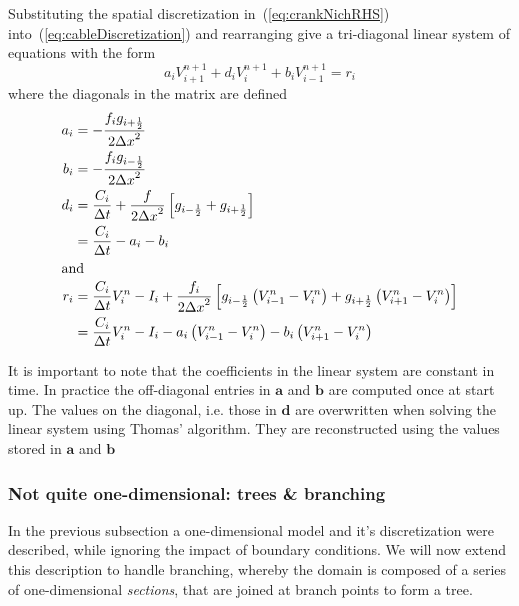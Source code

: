 \documentclass[11pt,a4paper]{article}
\newcommand{\eq}[1]{(\ref{#1})}
\newcommand{\dx}{{\Delta x}}
\newcommand{\dt}{{\Delta t}}
\newcommand{\at}[1]{{#1}_{i}}
\newcommand{\atplus}[1]{{#1}_{i+1}}
\newcommand{\atminus}[1]{{#1}_{i-1}}
\newcommand{\atplushalf}[1]{{#1}_{i+\frac{1}{2}}}
\newcommand{\atminushalf}[1]{{#1}_{i-\frac{1}{2}}}
\newcommand{\vv}[1]{\mathbf{#1}}
\begin{document}
Substituting the spatial discretization in~\eq{eq:crankNichRHS} into~\eq{eq:cableDiscretization} and rearranging give a tri-diagonal linear system of equations with the form
\begin{equation}
    \at{a} \atplus{V}^{n+1} + \at{d} \at{V}^{n+1} + \at{b} \atminus{V}^{n+1} = \at{r}
\end{equation}
where the diagonals in the matrix are defined
\begin{align}
    \at{a}  &=  -\frac{\at{f}\atplushalf{g}}{2\dx^2} \\
    \at{b}  &=  -\frac{\at{f}\atminushalf{g}}{2\dx^2} \\
    \at{d}  &=  \frac{\at{C}}{\dt} + \frac{f}{2\dx^2}\left[\atminushalf{g}+\atplushalf{g}\right] \nonumber\\
            &=  \frac{\at{C}}{\dt} - \at{a} - \at{b} \\
\intertext{and}
    \at{r}  &=  \frac{\at{C}}{\dt} \at{V}^n - \at{I} + \frac{\at{f}}{2\dx^2}
                    \left[
                        \atminushalf{g} \left( \atminus{V}^{n} - \at{V}^{n} \right)
                        +
                        \atplushalf{g}  \left( \atplus{V}^{n}  - \at{V}^{n} \right)
                    \right] \nonumber\\
            &=  \frac{\at{C}}{\dt} \at{V}^n
                - \at{I}
                - \at{a} \left( \atminus{V}^{n} - \at{V}^{n} \right)
                - \at{b} \left( \atplus{V}^{n}  - \at{V}^{n} \right)
\end{align}

It is important to note that the coefficients in the linear system are constant in time. In practice the off-diagonal entries in $\vv{a}$ and $\vv{b}$ are computed once at start up. The values on the diagonal, i.e. those in $\vv{d}$ are overwritten when solving the linear system using Thomas' algorithm. They are reconstructed using the values stored in $\vv{a}$ and $\vv{b}$
\subsubsection{Not quite one-dimensional: trees \& branching}
In the previous subsection a one-dimensional model and it's discretization were described, while ignoring the impact of boundary conditions. We will now extend this description to handle branching, whereby the domain is composed of a series of one-dimensional \emph{sections}, that are joined at branch points to form a tree.
\end{document}
